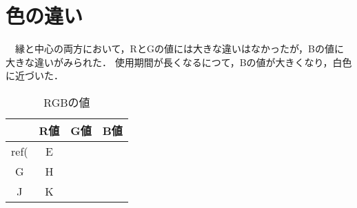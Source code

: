 \documentclass[main]{subfiles}
\begin{document}
\section{色の違い}

　縁と中心の両方において，RとGの値には大きな違いはなかったが，Bの値に大きな違いがみられた．
使用期間が長くなるにつて，Bの値が大きくなり，白色に近づいた．


\begin{table}[h]
    \caption{RGBの値}
    \label{table:SpeedOfLight}
    \centering
\begin{tabular}{|c|c|c|c|}
   \hline
    & R値 & G値 & B値 \\ \hline
   ref( & E & & \\ \hline
   G & H & & \\ \hline
   J & K & & \\ \hline
\end{tabular}    
\end{table}
\end{document}
